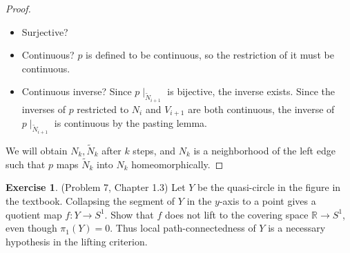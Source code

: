\documentclass[12pt, psamsfonts]{amsart}
\theoremstyle{definition}
\newtheorem*{exer}{Exercise}
\theoremstyle{remark}
\numberwithin{equation}{section}
\begin{document}
\begin{proof}
\begin{itemize}
\begin{figure}
        \caption{Problem 5(Injectivity)}
        \label{fig:problem5_injective}
      \end{figure}
      $c$ and $p(\tilde{a})$ are path connected in $N_i$, and $c$ and $p(\tilde{b})$ are path connected in $V_{i + 1}$.
      Thus $\tilde{c}$ and $\tilde{a}$ are path connected in $\tilde{N}_i$ and $\tilde{c}$ and $\tilde{b}$ are path connected in $\tilde{V}_{i + 1}$.
      Consider the path $\gamma$ from $\tilde{a}$ to $\tilde{b}$ formed by the two paths to $\tilde{c}$.
      A small neighborhood of $\tilde{c}$ is mapped homeomorphically to a neighborhood of $c$.
      However, this implies that one of $p(\tilde{a})$ or $p(\tilde{b})$ will be located above $c$ and the other one will be located below $c$.
      This is a contradiction because $p(\tilde{a}) = p(\tilde{b})$.
    \item
      Surjective?
      \todo[inline]{
      }
    \item
      Continuous?
      $p$ is defined to be continuous, so the restriction of it must be continuous.
    \item
      Continuous inverse?
      Since $p\mid_{\tilde{N}_{i + 1}}$ is bijective, the inverse exists.
      Since the inverses of $p$ restricted to $N_i$ and $V_{i + 1}$ are both continuous, the inverse of $p\mid_{\tilde{N}_{i + 1}}$ is continuous by the pasting lemma.
  \end{itemize}

  We will obtain $N_k, \tilde{N}_k$ after $k$ steps, and $N_k$ is a neighborhood of the left edge such that $p$ maps $\tilde{N}_k$ into $N_k$ homeomorphically.
\end{proof}

\begin{exer}{(Problem 7, Chapter 1.3)}
  Let $Y$ be the quasi-circle in the figure in the textbook.
  Collapsing the segment of $Y$ in the $y$-axis to a point gives a quotient map $f: Y \rightarrow S^1$.
  Show that $f$ does not lift to the covering space $\mathbb{R} \rightarrow S^1$, even though $\pi_1(Y) = 0$.
  Thus local path-connectedness of $Y$ is a necessary hypothesis in the lifting criterion.
\end{exer}
\end{document}
